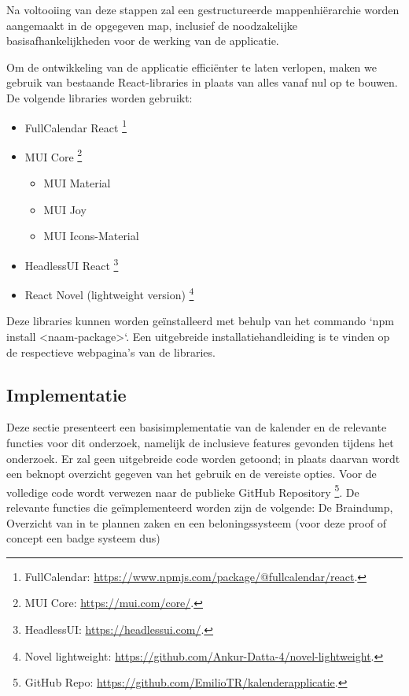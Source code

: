 Na voltooiing van deze stappen zal een gestructureerde mappenhiërarchie worden aangemaakt in de opgegeven map, inclusief de noodzakelijke basisafhankelijkheden voor de werking van de applicatie.\newline

Om de ontwikkeling van de applicatie efficiënter te laten verlopen, maken we gebruik van bestaande React-libraries in plaats van alles vanaf nul op te bouwen. De volgende libraries worden gebruikt:

\begin{itemize}[label=$\rightarrow$]
    \item FullCalendar React \footnote{FullCalendar:      \url{https://www.npmjs.com/package/@fullcalendar/react}.}
    \item MUI Core \footnote{MUI Core: \url{https://mui.com/core/}.}
    \begin{itemize}[label=-]
        \item MUI Material 
        \item MUI Joy
        \item MUI Icons-Material
    \end{itemize}
    
    \item HeadlessUI React \footnote{HeadlessUI: \url{https://headlessui.com/}.}
    \item React Novel (lightweight version)  \footnote{Novel lightweight: \url{https://github.com/Ankur-Datta-4/novel-lightweight}.}
\end{itemize}

Deze libraries kunnen worden geïnstalleerd met behulp van het commando `npm install <naam-package>`. Een uitgebreide installatiehandleiding is te vinden op de respectieve webpagina's van de libraries.

\subsection{Implementatie}

Deze sectie presenteert een basisimplementatie van de kalender en de relevante functies voor dit onderzoek, namelijk de inclusieve features gevonden tijdens het onderzoek. Er zal geen uitgebreide code worden getoond; in plaats daarvan wordt een beknopt overzicht gegeven van het gebruik en de vereiste opties. Voor de volledige code wordt verwezen naar de publieke GitHub Repository \footnote{GitHub Repo: \url{https://github.com/EmilioTR/kalenderapplicatie}.}. \newline
De relevante functies die geïmplementeerd worden zijn de volgende: De Braindump, Overzicht van in te plannen zaken en een beloningssysteem (voor deze proof of concept een badge systeem dus)


